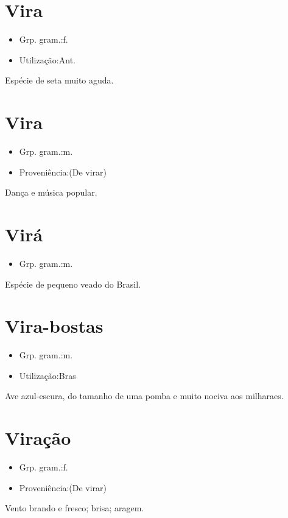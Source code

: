 \documentclass{article}
\begin{document}
\section{Vira}
\begin{itemize}
\item {Grp. gram.:f.}
\end{itemize}
\begin{itemize}
\item {Utilização:Ant.}
\end{itemize}
Espécie de seta muito aguda.
\section{Vira}
\begin{itemize}
\item {Grp. gram.:m.}
\end{itemize}
\begin{itemize}
\item {Proveniência:(De \textunderscore virar\textunderscore )}
\end{itemize}
Dança e música popular.
\section{Virá}
\begin{itemize}
\item {Grp. gram.:m.}
\end{itemize}
Espécie de pequeno veado do Brasil.
\section{Vira-bostas}
\begin{itemize}
\item {Grp. gram.:m.}
\end{itemize}
\begin{itemize}
\item {Utilização:Bras}
\end{itemize}
Ave azul-escura, do tamanho de uma pomba e muito nociva aos milharaes.
\section{Viração}
\begin{itemize}
\item {Grp. gram.:f.}
\end{itemize}
\begin{itemize}
\item {Proveniência:(De \textunderscore virar\textunderscore )}
\end{itemize}
Vento brando e fresco; brisa; aragem.
\end{document}
